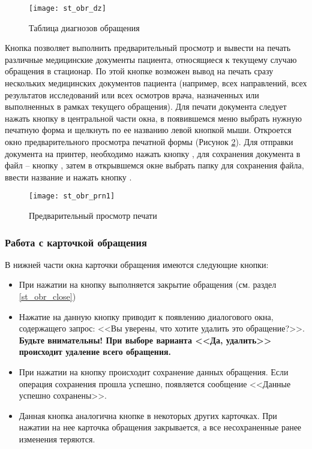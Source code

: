 \begin{figure}[ht!]\centering
   \texttt{[image: st\_obr\_dz]}
   \caption{Таблица диагнозов обращения}
   \label{img_st_obr_dz}
\end{figure}

Кнопка  позволяет выполнить предварительный просмотр и вывести на печать различные медицинские документы пациента, относящиеся  к текущему случаю обращения в стационар. По этой кнопке возможен вывод на печать сразу нескольких медицинских документов пациента (например, всех направлений, всех результатов исследований или всех осмотров врача, назначенных или выполненных в рамках текущего обращения). Для печати документа следует нажать кнопку  в центральной части окна, в появившемся меню выбрать нужную печатную форма и щелкнуть по ее названию левой кнопкой мыши. Откроется окно предварительного просмотра печатной формы (Рисунок \ref{img_st_obr_prn1}). Для отправки документа на принтер, необходимо нажать кнопку , для сохранения документа в файл – кнопку , затем в открывшемся окне выбрать папку для сохранения файла, ввести название и нажать кнопку .

\begin{figure}[ht]\centering
   \texttt{[image: st\_obr\_prn1]}
   \caption{Предварительный просмотр печати}
   \label{img_st_obr_prn1}
\end{figure}
 
\subsubsection{Работа с карточкой обращения}

В нижней части окна карточки обращения имеются следующие кнопки:
\begin{itemize}
 \item При нажатии на кнопку  выполняется закрытие обращения (см. раздел \ref{st_obr_close})
 \item {} Нажатие на данную кнопку приводит к появлению диалогового окна, содержащего запрос: <<Вы уверены, что хотите удалить это обращение?>>. \textbf{Будьте внимательны! При выборе варианта <<Да, удалить>> происходит удаление всего обращения.}
 \item {} При нажатии на кнопку происходит сохранение данных обращения. Если операция сохранения прошла успешно, появляется сообщение <<Данные успешно сохранены>>.
 \item {} Данная кнопка аналогична кнопке  в некоторых других карточках. При нажатии на нее карточка обращения закрывается, а все несохраненные ранее изменения теряются.
\end{itemize}

